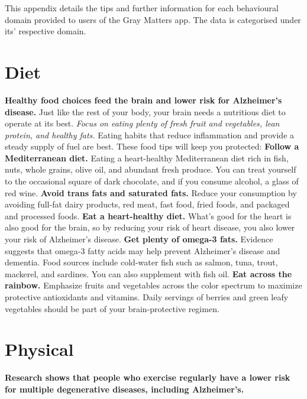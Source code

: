  \label{apndx: domain-tips}
This appendix details the tips and further information for each behavioural domain provided to users of the Gray Matters app. The data is categorised under its' respective domain.

\section{Diet}
\textbf{Healthy food choices feed the brain and lower risk for Alzheimer's disease.}
Just like the rest of your body, your brain needs a nutritious diet to operate at its best. \textit{Focus on eating plenty of fresh fruit and vegetables, lean protein, and healthy fats.}
Eating habits that reduce inflammation and provide a steady supply of fuel are best. These food tips will keep you protected:
\newline \textbf{Follow a Mediterranean diet.}
Eating a heart-healthy Mediterranean diet rich in fish, nuts, whole grains, olive oil, and abundant fresh produce. You can treat yourself to the occasional square of dark chocolate, and if you consume alcohol, a glass of red wine.
\newline \textbf{Avoid trans fats and saturated fats.}
Reduce your consumption by avoiding full-fat dairy products, red meat, fast food, fried foods, and packaged and processed foods.
\newline \textbf{Eat a heart-healthy diet.}
What's good for the heart is also good for the brain, so by reducing your risk of heart disease, you also lower your risk of Alzheimer's disease.
\newline \textbf{Get plenty of omega-3 fats.}
Evidence suggests that omega-3 fatty acids may help prevent Alzheimer's disease and dementia. Food sources include cold-water fish such as salmon, tuna, trout, mackerel, and sardines. You can also supplement with fish oil.
\newline \textbf{Eat across the rainbow.}
Emphasize fruits and vegetables across the color spectrum to maximize protective antioxidants and vitamins. Daily servings of berries and green leafy vegetables should be part of your brain-protective regimen.

\section{Physical}
\textbf{Research shows that people who exercise regularly have a lower risk for multiple degenerative diseases, including Alzheimer's.}

